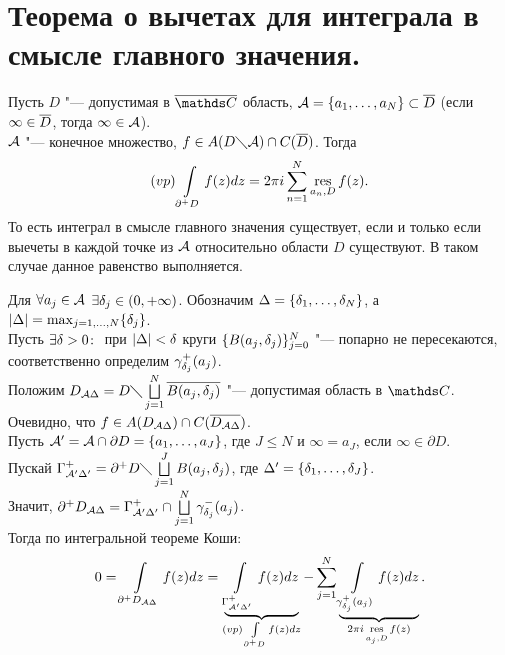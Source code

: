 \newpage
\section{Теорема о вычетах для интеграла в смысле главного значения.}
\begin{The} 
Пусть $D$ "--- допустимая в $\ol\C$ область, $\mathcal A = \{a_1,\dots,a_N\} \subset \overline{D}$ (если $\infty \in \overline{D}$, тогда $\infty \in \mathcal A$). \\
$\mathcal A$ "--- конечное множество, $f \in A(D\diagdown\mathcal A)\cap C(\overline{D})$.
Тогда
\[
(vp)\int\limits_{\partial^{+}D}f(z)dz = 2\pi i \sum\limits_{n=1}^N \mathop{\rm res}\limits\limits_{a_n , D} f(z).
\]
То есть интеграл в смысле главного значения существует, если и только если выечеты в каждой точке из $\mathcal A$ относительно области $D$ существуют. В таком случае данное равенство выполняется.
\end{The}

\begin{Proof}
 Для $\forall a_j \in \mathcal A$  $\exists \delta_j \in (0,+\infty)$. Обозначим $\Delta = \{\delta_1,\dots,\delta_N\}$, а $|\Delta| = {\max_{j=1,\dots,N}} \{\delta_j\}$.\\
 Пусть $\exists \delta > 0 \colon$  при $|\Delta| < \delta$ круги $\{B(a_j,\delta_j)\}_{j=0}^N$ "--- попарно не пересекаются, соответственно определим $\gamma_{\delta_j}^{+}(a_j)$.\\ 
 Положим $D_{\mathcal A\Delta} = D\diagdown \bigsqcup\limits_{j=1}^N \overline{B(a_j,\delta_j)}$ "--- допустимая область в $\C$. \\
 Очевидно, что $f \in A(D_{\mathcal A\Delta}) \cap C(\overline{D_{\mathcal A\Delta}})$.\\
 Пусть $\mathcal A' = \mathcal A \cap \partial D = \{a_1,\dots,a_J\}$, где $J \le N$ и $\infty = a_J$, если $\infty \in \partial D$.\\
 Пускай $\Gamma^{+}_{\mathcal A'\Delta'} = \partial^{+} D\diagdown \bigsqcup\limits_{j=1}^J {B(a_j,\delta_j)}$, где $\Delta' = \{\delta_1,\dots,\delta_J\}$.\\
 Значит, $\partial^{+} D_{\mathcal A\Delta} = \Gamma^{+}_{\mathcal A'\Delta'} \cap \bigsqcup\limits_{j=1}^N \gamma_{\delta_j}^{-}(a_j)$.\\
 Тогда по интегральной теореме Коши:
 \[
0 = \int\limits_{\partial^{+} D_{\mathcal A\Delta}} f(z)dz =\underbrace{\int\limits_{\Gamma^{+}_{\mathcal A'\Delta'}} f(z)dz}_{(vp)\int\limits_{\partial^{+} D} f(z)dz} - \sum\limits_{j=1}^{N} \underbrace{\int\limits_{\gamma_{\delta_j}^{+}(a_j)} f(z)dz}_{2\pi i\mathop{\rm res}\limits\limits_{a_j,D} f(z) }.
 \]
\end{Proof}